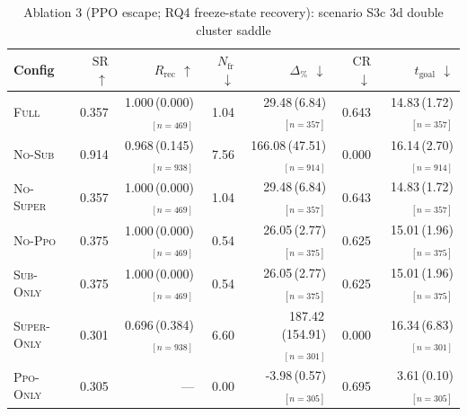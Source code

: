 \begin{table}[h]
\centering
\small
\caption{Ablation 3 (PPO escape; RQ4 freeze-state recovery): scenario S3c 3d double cluster saddle}
\label{tab:abl3:S3c_3d_double_cluster_saddle}
\begin{tabular}{lrrrrrr}
\toprule
Config & $\mathrm{SR}$ $\uparrow$ & $R_{\mathrm{rec}}$ $\uparrow$ & $N_{\mathrm{fr}}$ $\downarrow$ & $\Delta_{\%}$ $\downarrow$ & $\mathrm{CR}$ $\downarrow$ & $t_{\mathrm{goal}}$ $\downarrow$ \\
\midrule
\textsc{Full} & 0.357 & 1.000\,(0.000)$_{[n=469]}$ & 1.04 & 29.48\,(6.84)$_{[n=357]}$ & 0.643 & 14.83\,(1.72)$_{[n=357]}$ \\
\textsc{No-Sub} & 0.914 & 0.968\,(0.145)$_{[n=938]}$ & 7.56 & 166.08\,(47.51)$_{[n=914]}$ & 0.000 & 16.14\,(2.70)$_{[n=914]}$ \\
\textsc{No-Super} & 0.357 & 1.000\,(0.000)$_{[n=469]}$ & 1.04 & 29.48\,(6.84)$_{[n=357]}$ & 0.643 & 14.83\,(1.72)$_{[n=357]}$ \\
\textsc{No-Ppo} & 0.375 & 1.000\,(0.000)$_{[n=469]}$ & 0.54 & 26.05\,(2.77)$_{[n=375]}$ & 0.625 & 15.01\,(1.96)$_{[n=375]}$ \\
\textsc{Sub-Only} & 0.375 & 1.000\,(0.000)$_{[n=469]}$ & 0.54 & 26.05\,(2.77)$_{[n=375]}$ & 0.625 & 15.01\,(1.96)$_{[n=375]}$ \\
\textsc{Super-Only} & 0.301 & 0.696\,(0.384)$_{[n=938]}$ & 6.60 & 187.42\,(154.91)$_{[n=301]}$ & 0.000 & 16.34\,(6.83)$_{[n=301]}$ \\
\textsc{Ppo-Only} & 0.305 & --- & 0.00 & -3.98\,(0.57)$_{[n=305]}$ & 0.695 & 3.61\,(0.10)$_{[n=305]}$ \\
\bottomrule
\end{tabular}
\end{table}